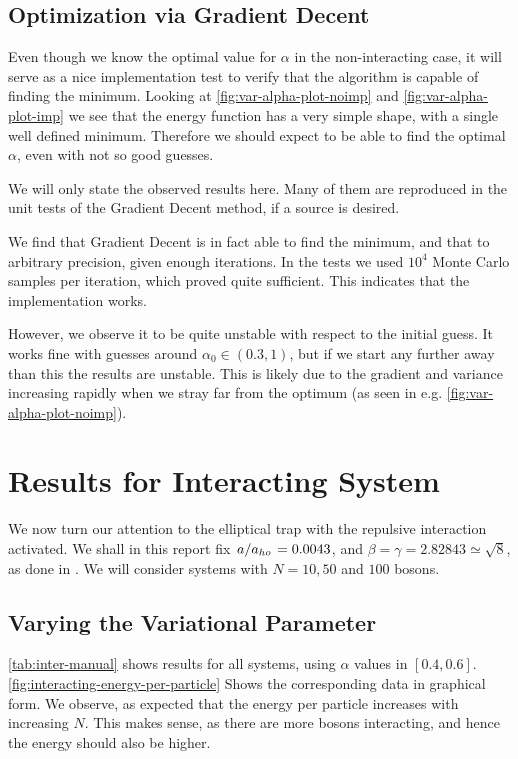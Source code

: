 \documentclass[a4paper, 11pt]{article}
\begin{document}
\begin{multicols}{2}

\subsection{Optimization via Gradient Decent}

Even though we know the optimal value for $\alpha$ in the non-interacting case,
it will serve as a nice implementation test to verify that the algorithm is
capable of finding the minimum. Looking at \autoref{fig:var-alpha-plot-noimp}
and \ref{fig:var-alpha-plot-imp} we see that the energy function has a very
simple shape, with a single well defined minimum. Therefore we should expect to
be able to find the optimal $\alpha$, even with not so good guesses.

We will only state the observed results here. Many of them are reproduced in the
unit tests of the Gradient Decent method, if a source is desired.

We find that Gradient Decent is in fact able to find the minimum, and that to
arbitrary precision, given enough iterations. In the tests we used $10^4$ Monte
Carlo samples per iteration, which proved quite sufficient. This indicates that the
implementation works. 

However, we observe it to be quite unstable with respect to the initial guess.
It works fine with guesses around $\alpha_0\in (0.3, 1)$, but if we start any
further away than this the results are unstable. This is likely due to the
gradient and variance increasing rapidly when we stray far from the optimum (as
seen in e.g. \autoref{fig:var-alpha-plot-noimp}). 

\section{Results for Interacting System}

We now turn our attention to the elliptical trap with the repulsive interaction
activated. We shall in this report fix $\flatfrac{a}{a_{ho}}=0.0043$, and
$\beta=\gamma=2.82843\simeq\sqrt{8}$, as done in \cite{DuBois-phys-rev,
Nilsen-phys-rev}. We will consider systems with $N=10, 50$ and $100$ bosons.


\subsection{Varying the Variational Parameter}

\autoref{tab:inter-manual} shows results for all systems, using $\alpha$ values
in $[0.4, 0.6]$. \autoref{fig:interacting-energy-per-particle} Shows the
corresponding data in graphical form. We observe, as expected that the energy
per particle increases with increasing $N$. This makes sense, as there are more
bosons interacting, and hence the energy should also be higher. 


\end{multicols}
\end{document}
